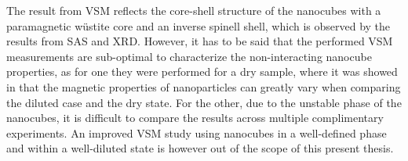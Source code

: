 \documentclass[\main/dresen_thesis.tex]{subfiles}
\begin{document}
  The result from VSM reflects the core-shell structure of the nanocubes with a paramagnetic w\"ustite core and an inverse spinell shell, which is observed by the results from SAS and XRD.
  However, it has to be said that the performed VSM measurements are sub-optimal to characterize the non-interacting nanocube properties, as for one they were performed for a dry sample, where it was showed in  that the magnetic properties of nanoparticles can greatly vary when comparing the diluted case and the dry state.
  For the other, due to the unstable phase of the nanocubes, it is difficult to compare the results across multiple complimentary experiments.
  An improved VSM study using nanocubes in a well-defined phase and within a well-diluted state is however out of the scope of this present thesis.
\end{document}

